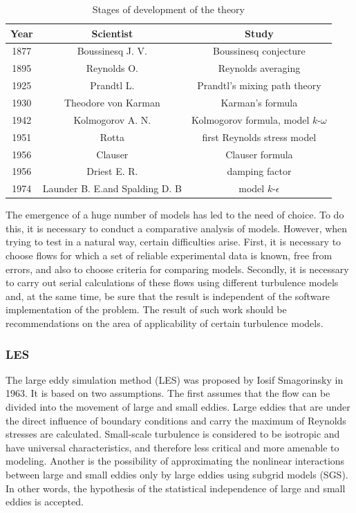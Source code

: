 	\begin{table}[H]
		\begin{center}
			\begin{tabular}{|c|c|c|}
				\hline
				Year & Scientist & Study\\
				\hline
				1877 & Boussinesq J. V. & Boussinesq conjecture\\
				\hline
				1895 & Reynolds O. & Reynolds averaging\\
				\hline
				1925 & Prandtl L. & Prandtl's mixing path theory\\
				\hline
				1930 & Theodore von Karman & Karman's formula\\
				\hline
				1942 & Kolmogorov A. N. & Kolmogorov formula, model $k$-$\omega$\\
				\hline
				1951 & Rotta & first Reynolds stress model\\
				\hline
				1956 & Clauser & Clauser formula\\
				\hline
				1956 & Driest E. R. & damping factor\\
				\hline
				1974 & Launder B. E.and Spalding D. B & model $k$-$\epsilon$\\
				\hline
			\end{tabular}
		\end{center}
		\caption{Stages of development of the theory}
	\end{table}
	
	The emergence of a huge number of models has led to the need of choice. To do this, it is necessary to conduct a comparative analysis of models. However, when trying to test in a natural way, certain difficulties arise. First, it is necessary to choose flows for which a set of reliable experimental data is known, free from errors, and also to choose criteria for comparing models. Secondly, it is necessary to carry out serial calculations of these flows using different turbulence models and, at the same time, be sure that the result is independent of the software implementation of the problem. The result of such work should be recommendations on the area of applicability of certain turbulence models.
	
\subsubsection{LES}
	The large eddy simulation method (LES) was proposed by Iosif Smagorinsky in 1963. It is based on two assumptions. The first assumes that the flow can be divided into the movement of large and small eddies. Large eddies that are under the direct influence of boundary conditions and carry the maximum of Reynolds stresses are calculated. Small-scale turbulence is considered to be isotropic and have universal characteristics, and therefore less critical and more amenable to modeling. Another is the possibility of approximating the nonlinear interactions between large and small eddies only by large eddies using subgrid models (SGS). In other words, the hypothesis of the statistical independence of large and small eddies is accepted.
	
